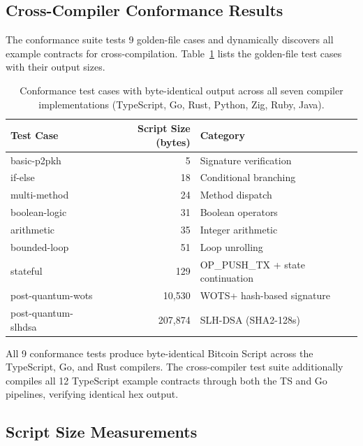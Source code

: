 \documentclass[11pt,a4paper]{article}
\begin{document}
\subsection{Cross-Compiler Conformance Results}
\label{sec:eval-conformance}

The conformance suite tests 9 golden-file cases and dynamically discovers
all example contracts for cross-compilation. Table~\ref{tab:conformance}
lists the golden-file test cases with their output sizes.

\begin{table}[h]
\centering
\small
\begin{tabular}{@{}lrl@{}}
\toprule
\textbf{Test Case} & \textbf{Script Size (bytes)} & \textbf{Category} \\
\midrule
basic-p2pkh & 5 & Signature verification \\
if-else & 18 & Conditional branching \\
multi-method & 24 & Method dispatch \\
boolean-logic & 31 & Boolean operators \\
arithmetic & 35 & Integer arithmetic \\
bounded-loop & 51 & Loop unrolling \\
stateful & 129 & OP\_PUSH\_TX + state continuation \\
post-quantum-wots & 10,530 & WOTS+ hash-based signature \\
post-quantum-slhdsa & 207,874 & SLH-DSA (SHA2-128s) \\
\bottomrule
\end{tabular}
\caption{Conformance test cases with byte-identical output across
  all seven compiler implementations (TypeScript, Go, Rust, Python, Zig, Ruby, Java).}
\label{tab:conformance}
\end{table}

All 9 conformance tests produce byte-identical Bitcoin Script across the
TypeScript, Go, and Rust compilers. The cross-compiler test suite additionally
compiles all 12 TypeScript example contracts through both the TS and Go
pipelines, verifying identical hex output.

\subsection{Script Size Measurements}
\label{sec:eval-sizes}
\end{document}
